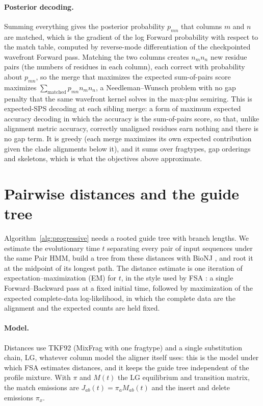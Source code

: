 \documentclass[11pt]{article}
\begin{document}
\paragraph{Posterior decoding.} Summing everything gives the posterior
probability $p_{mn}$ that columns $m$ and $n$ are matched, which is the gradient
of the log Forward probability with respect to the match table, computed by
reverse-mode differentiation of the checkpointed wavefront Forward pass.
Matching the two columns creates $n_mn_n$ new residue pairs (the numbers of
residues in each column), each correct with probability about $p_{mn}$, so the
merge that maximizes the expected sum-of-pairs score maximizes
$\sum_{\text{matched}}p_{mn}n_mn_n$, a Needleman--Wunsch problem with no gap
penalty that the same wavefront kernel solves in the max-plus semiring. This is
expected-SPS decoding at each sibling merge: a form of maximum expected accuracy
decoding \citep{HolmesDurbin1998,Do2005} in which the accuracy is the sum-of-pairs
score, so that, unlike alignment metric accuracy, correctly unaligned residues
earn nothing and there is no gap term. It is greedy (each merge maximizes its own
expected contribution given the clade alignments below it), and it sums over
fragtypes, gap orderings and skeletons, which is what the objectives above
approximate.

\section{Pairwise distances and the guide tree}
\label{sec:distances}

Algorithm~\ref{alg:progressive} needs a rooted guide tree with branch
lengths. We estimate the evolutionary time $t$ separating every pair of
input sequences under the same Pair HMM, build a tree from these distances
with BioNJ \citep{Gascuel1997}, and root it at the midpoint of its longest
path. The distance estimate is one iteration of expectation--maximization
(EM) for $t$, in the style used by FSA \citep{Bradley2009}: a single
Forward--Backward pass at a fixed initial time, followed by maximization of
the expected complete-data log-likelihood, in which the complete data are
the alignment and the expected counts are held fixed.

\paragraph{Model.} Distances use TKF92 (MixFrag with one fragtype) and a
single substitution chain, LG, whatever column model the aligner itself uses:
this is the model under which FSA estimates distances, and it keeps the guide
tree independent of the profile mixture. With $\pi$ and $M(t)$ the LG
equilibrium and transition matrix, the match emissions are
$J_{ab}(t)=\pi_aM_{ab}(t)$ and the insert and delete emissions $\pi_x$.
\end{document}
